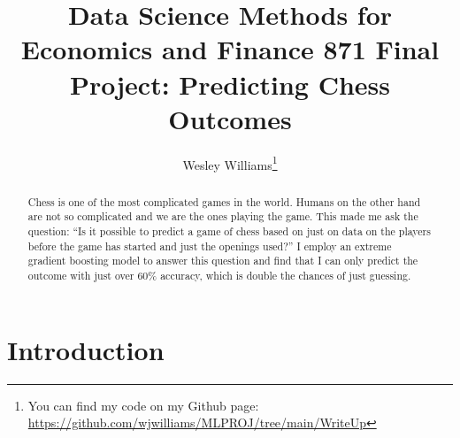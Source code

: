 \documentclass[12pt,preprint, authoryear]{elsarticle}
\numberwithin{equation}{section}
\numberwithin{figure}{section}
\numberwithin{table}{section}
\let\rmarkdownfootnote\footnote%
\def\footnote{\protect\rmarkdownfootnote}
\begin{document}
\begin{frontmatter}  %

\title{Data Science Methods for Economics and Finance 871 Final Project:
Predicting Chess Outcomes}





\author[Add1]{Wesley Williams\footnote{You can find my code on my Github
  page: \url{https://github.com/wjwilliams/MLPROJ/tree/main/WriteUp}}}





\address[Add1]{Stellenbosch University, South Africa}


\begin{abstract}
\small{
Chess is one of the most complicated games in the world. Humans on the
other hand are not so complicated and we are the ones playing the game.
This made me ask the question: ``Is it possible to predict a game of
chess based on just on data on the players before the game has started
and just the openings used?'' I employ an extreme gradient boosting
model to answer this question and find that I can only predict the
outcome with just over 60\% accuracy, which is double the chances of
just guessing.
}
\end{abstract}

\vspace{1cm}





\vspace{0.5cm}

\end{frontmatter}

\setcounter{footnote}{0}


\renewcommand{\contentsname}{Table of Contents}
{\tableofcontents}

\pagestyle{fancy}
\chead{}
\rhead{}
\lfoot{}
\lhead{}
\cfoot{}


\headsep 35pt %




\newpage

\hypertarget{introduction}{%
\section{\texorpdfstring{Introduction
\label{Introduction}}{Introduction }}\label{introduction}}
\end{document}
